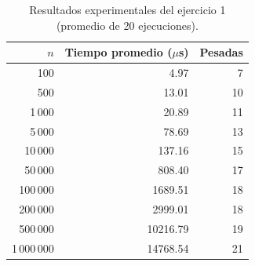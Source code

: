 \begin{table}[h]
    \centering
    \begin{tabular}{r r r}
    \hline
    $n$ & Tiempo promedio ($\mu$s) & Pesadas \\
    \hline
    100       & 4.97     & 7  \\
    500       & 13.01    & 10 \\
    1\,000    & 20.89    & 11 \\
    5\,000    & 78.69    & 13 \\
    10\,000   & 137.16   & 15 \\
    50\,000   & 808.40   & 17 \\
    100\,000  & 1689.51  & 18 \\
    200\,000  & 2999.01  & 18 \\
    500\,000  & 10216.79 & 19 \\
    1\,000\,000 & 14768.54 & 21 \\
    \hline
    \end{tabular}
    \caption{Resultados experimentales del ejercicio 1 (promedio de 20 ejecuciones).}
    \label{tab:ej1-resultados}
\end{table}
